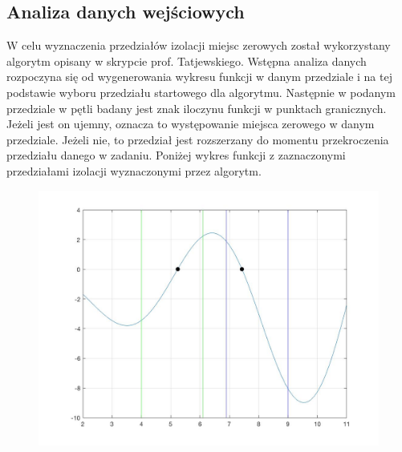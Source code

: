 \documentclass[11pt, oneside]{article}   	%
\begin{document}
\subsection{Analiza danych wejściowych}
W celu wyznaczenia przedziałów izolacji miejsc zerowych został wykorzystany algorytm opisany w skrypcie prof. Tatjewskiego. Wstępna analiza danych rozpoczyna się od wygenerowania wykresu funkcji w danym przedziale i na tej podstawie wyboru przedziału startowego dla algorytmu. Następnie w podanym przedziale w pętli badany jest znak iloczynu funkcji w punktach granicznych. Jeżeli jest on ujemny, oznacza to występowanie miejsca zerowego w danym przedziale. Jeżeli nie, to przedział jest rozszerzany do momentu przekroczenia przedziału danego w zadaniu. 
Poniżej wykres funkcji z zaznaczonymi przedziałami izolacji wyznaczonymi przez algorytm. 

\begin{figure}[h]
\includegraphics[width=\textwidth]{figure1.jpg}
\end{figure}
\end{document}
